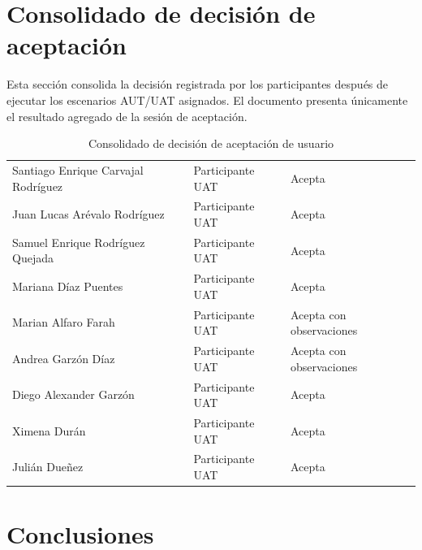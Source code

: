 \documentclass[12pt,letterpaper]{article}
\begin{document}
\section{Consolidado de decisión de aceptación}

Esta sección consolida la decisión registrada por los participantes después de ejecutar los escenarios AUT/UAT asignados. El documento presenta únicamente el resultado agregado de la sesión de aceptación.

\begin{table}[H]
\centering
\begingroup
\scriptsize
\setlength{\tabcolsep}{3pt}
\renewcommand{\arraystretch}{1.25}

\begin{tabularx}{\textwidth}{|
>{\raggedright\arraybackslash}p{4.8cm}|
>{\raggedright\arraybackslash}p{4.0cm}|
>{\raggedright\arraybackslash}X|}
\hline
\multicolumn{1}{|>{\centering\arraybackslash}m{4.8cm}|}{\textbf{Nombre}} &
\multicolumn{1}{>{\centering\arraybackslash}m{4.0cm}|}{\textbf{Rol}} &
\multicolumn{1}{>{\centering\arraybackslash}m{5.4cm}|}{\textbf{Decisión}} \\
\hline
Santiago Enrique Carvajal Rodríguez & Participante UAT & Acepta \\
\hline
Juan Lucas Arévalo Rodríguez & Participante UAT & Acepta \\
\hline
Samuel Enrique Rodríguez Quejada & Participante UAT & Acepta \\
\hline
Mariana Díaz Puentes & Participante UAT & Acepta \\
\hline
Marian Alfaro Farah & Participante UAT & Acepta con observaciones \\
\hline
Andrea Garzón Díaz & Participante UAT & Acepta con observaciones \\
\hline
Diego Alexander Garzón & Participante UAT & Acepta \\
\hline
Ximena Durán & Participante UAT & Acepta \\
\hline
Julián Dueñez & Participante UAT & Acepta \\
\hline
\end{tabularx}

\endgroup
\caption{Consolidado de decisión de aceptación de usuario}
\label{tab:consolidado-decision-aceptacion-usuario}
\end{table}

\section{Conclusiones}
\end{document}
